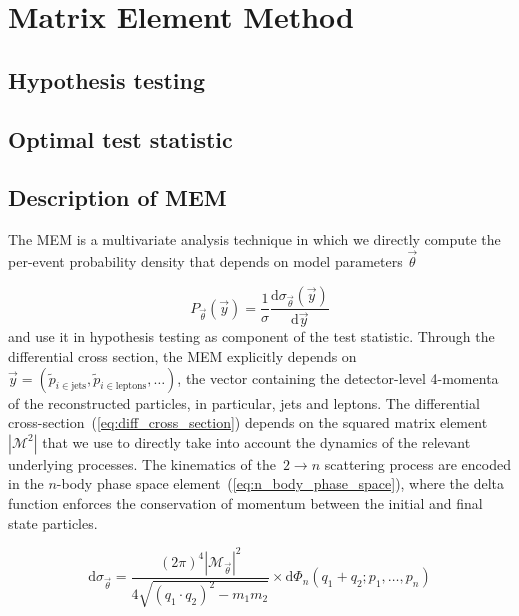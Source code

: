 \section{Matrix Element Method}
\label{sec:mem}

\subsection{Hypothesis testing}

\subsection{Optimal test statistic}
\label{sec:test_statistic}

\subsection{Description of MEM}

The MEM is a multivariate analysis technique in which we directly compute the per-event probability density that depends on model parameters $\vec{\theta}$

\begin{equation}
P_{\vec{\theta}}(\vec{y}) = \frac{1}{\sigma}
\frac{\mathrm{d}\sigma_{\vec{\theta}}(\vec{y})}{\mathrm{d}\vec{y}}
\end{equation}
and use it in hypothesis testing as component of the test statistic. Through the differential cross section, the MEM explicitly depends on~$\vec{y} = (\tilde{p}_{i \in \mathrm{jets}}, \tilde{p}_{i \in \mathrm{leptons}}, \dots)$, the vector containing the detector-level 4-momenta of the reconstructed particles, in particular, jets and leptons. The differential cross-section~(\cref{eq:diff_cross_section}) depends on the squared matrix element~$|\mathcal{M}^2|$ that we use to directly take into account the dynamics of the relevant underlying processes. The kinematics of the~$2 \rightarrow n$ scattering process are encoded in the $n$-body phase space element~(\cref{eq:n_body_phase_space}), where the delta function enforces the conservation of momentum between the initial and final state particles.

\begin{equation}
\label{eq:diff_cross_section}
\mathrm{d}\sigma_{\vec{\theta}} = \frac{(2\pi)^4 |\mathcal{M}_{\vec{\theta}}|^2}{4 \sqrt{(q_1 \cdot q_2)^2 - m_1 m_2}} \times
\mathrm{d}\Phi_n(q_1 + q_2; p_1, \dots, p_{n})
\end{equation}


